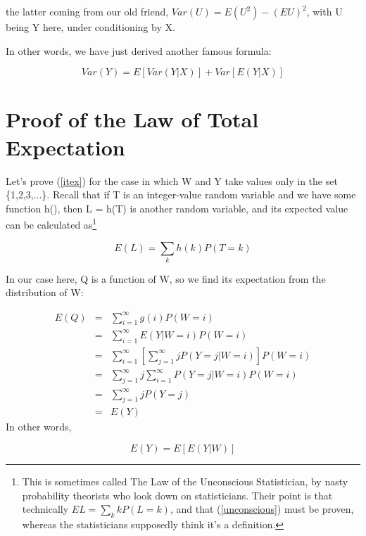 \documentclass[11pt]{article}
\begin{document}
the latter coming from our old friend, $Var(U) = E(U^2) - (EU)^2$, with
U being Y here, under conditioning by X.

In other words, we have just derived another famous formula:

\begin{equation}
Var(Y) = E[Var(Y|X)] + Var[E(Y|X)]
\end{equation}

\section{Proof of the Law of Total Expectation}
\label{proveitex} 

Let's prove (\ref{itex}) for the case in which W and Y take values only
in the set \{1,2,3,...\}.  Recall that if T is an integer-value random
variable and we have some function h(), then L = h(T) is another random
variable, and its expected value can be calculated as\footnote{This is
sometimes called The Law of the Unconscious Statistician, by nasty
probability theorists who look down on statisticians.  Their point is
that technically $EL = \sum_k k P(L = k)$, and that (\ref{unconscious})
must be proven, whereas the statisticians supposedly think it's a
definition.}  

\begin{equation}
\label{unconscious}
E(L) = \sum_k h(k) P(T = k)
\end{equation}

In our case here, Q is a function of W, so we find its expectation from
the distribution of W:

\begin{eqnarray*}
E(Q) & = & \sum ^{\infty }_{i=1}g(i) P(W=i)\\
 & = & \sum ^{\infty }_{i=1}E(Y|W=i)P(W=i)\\
 & = & \sum ^{\infty }_{i=1} \left [ \sum ^{\infty }_{j=1}jP(Y=j|W=i) \right ] P(W=i) \\
 & = & \sum ^{\infty }_{j=1}j\sum ^{\infty }_{i=1}P(Y=j|W=i)P(W=i)\\
 & = & \sum ^{\infty }_{j=1}jP(Y=j)\\
 & = & E(Y)
\end{eqnarray*}
 In other words, 

\begin{equation}
E(Y)=E[E(Y|W)]
\end{equation}
\end{document}
